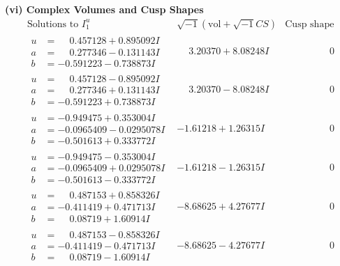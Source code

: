 \documentclass[1p]{elsarticle_modified}
\theoremstyle{definition}
\newcommand{\I}{\sqrt{-1}}
\begin{document}
\newpage\flushleft \textbf{(vi) Complex Volumes and Cusp Shapes}
$$\begin{array}{c|c|c}  
\text{Solutions to }I^u_{1}& \I (\text{vol} + \sqrt{-1}CS) & \text{Cusp shape}\\
 \hline 
\begin{aligned}
u &= \phantom{-}0.457128 + 0.895092 I \\
a &= \phantom{-}0.277346 - 0.131143 I \\
b &= -0.591223 - 0.738873 I\end{aligned}
 & \phantom{-}3.20370 + 8.08248 I & \phantom{-0.000000 } 0 \\ \hline\begin{aligned}
u &= \phantom{-}0.457128 - 0.895092 I \\
a &= \phantom{-}0.277346 + 0.131143 I \\
b &= -0.591223 + 0.738873 I\end{aligned}
 & \phantom{-}3.20370 - 8.08248 I & \phantom{-0.000000 } 0 \\ \hline\begin{aligned}
u &= -0.949475 + 0.353004 I \\
a &= -0.0965409 - 0.0295078 I \\
b &= -0.501613 + 0.333772 I\end{aligned}
 & -1.61218 + 1.26315 I & \phantom{-0.000000 } 0 \\ \hline\begin{aligned}
u &= -0.949475 - 0.353004 I \\
a &= -0.0965409 + 0.0295078 I \\
b &= -0.501613 - 0.333772 I\end{aligned}
 & -1.61218 - 1.26315 I & \phantom{-0.000000 } 0 \\ \hline\begin{aligned}
u &= \phantom{-}0.487153 + 0.858326 I \\
a &= -0.411419 + 0.471713 I \\
b &= \phantom{-}0.08719 + 1.60914 I\end{aligned}
 & -8.68625 + 4.27677 I & \phantom{-0.000000 } 0 \\ \hline\begin{aligned}
u &= \phantom{-}0.487153 - 0.858326 I \\
a &= -0.411419 - 0.471713 I \\
b &= \phantom{-}0.08719 - 1.60914 I\end{aligned}
 & -8.68625 - 4.27677 I & \phantom{-0.000000 } 0 \\ \hline\begin{aligned}

\end{aligned}
\end{array}$$
\end{document}
